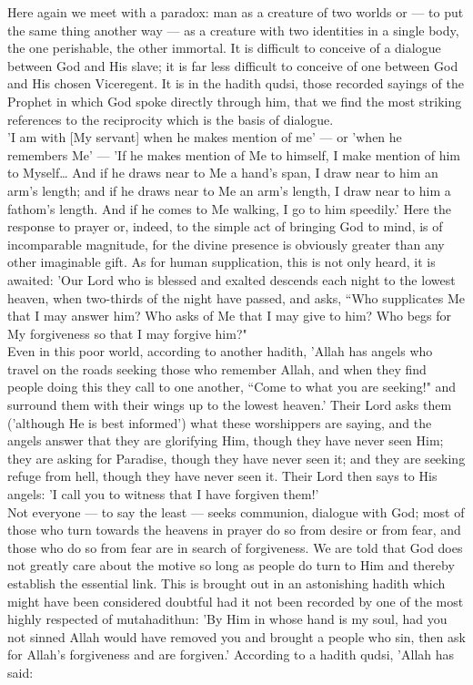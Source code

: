 \documentclass[10pt, twoside,openright]{book}
\begin{document}
Here again we meet with a paradox: man as a creature of two worlds or --- to put the same thing another 
way --- as a creature with two identities in a single body, the one perishable, the other immortal. It 
is difficult to conceive of a dialogue between God and His slave; it is far less difficult to 
conceive of one between God and His chosen Viceregent. It is in the hadith qudsi, those recorded 
sayings of the Prophet in which God spoke directly through him, that we find the most striking 
references to the reciprocity which is the basis of dialogue. \\

'I am with [My servant] when he makes mention of me' --- or 'when he remembers Me' --- 'If he makes 
mention of Me to himself, I make mention of him to Myself\ldots{} And if he draws near to Me a hand's 
span, I draw near to him an arm's length; and if he draws near to Me an arm's length, I draw near to 
him a fathom's length. And if he comes to Me walking, I go to him speedily.' Here the response to 
prayer or, indeed, to the simple act of bringing God to mind, is of incomparable magnitude, for the 
divine presence is obviously greater than any other imaginable gift. As for human supplication, this 
is not only heard, it is awaited: 'Our Lord who is blessed and exalted descends each night to the 
lowest heaven, when two\hyp{}thirds of the night have passed, and asks, ``Who supplicates Me that I may 
answer him? Who asks of Me that I may give to him? Who begs for My forgiveness so that I may forgive 
him?" \\

Even in this poor world, according to another hadith, 'Allah has angels who travel on the roads 
seeking those who remember Allah, and when they find people doing this they call to one another, 
``Come to what you are seeking!" and surround them with their wings up to the lowest heaven.' Their 
Lord asks them ('although He is best informed') what these worshippers are saying, and the angels 
answer that they are glorifying Him, though they have never seen Him; they are asking for Paradise, 
though they have never seen it; and they are seeking refuge from hell, though they have never seen 
it. Their Lord then says to His angels: 'I call you to witness that I have forgiven them!' \\

Not everyone --- to say the least --- seeks communion, dialogue with God; most of those who turn towards 
the heavens in prayer do so from desire or from fear, and those who do so from fear are in search of 
forgiveness. We are told that God does not greatly care about the motive so long as people do turn to 
Him and thereby establish the essential link. This is brought out in an astonishing hadith which 
might have been considered doubtful had it not been recorded by one of the most highly respected of 
mutahadithun: 'By Him in whose hand is my soul, had you not sinned Allah would have removed you and 
brought a people who sin, then ask for Allah's forgiveness and are forgiven.' According to a hadith 
qudsi, 'Allah has said: \\
\end{document}
